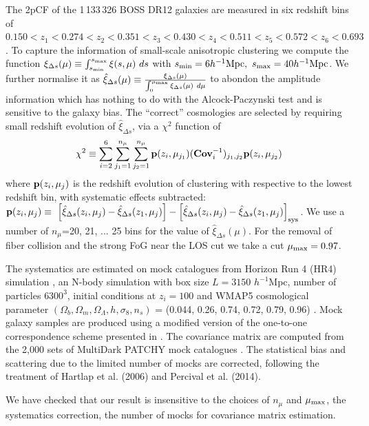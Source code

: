 \documentclass[useAMS,usenatbib]{mnras}
\begin{document}
The 2pCF of the 1\,133\,326 BOSS DR12 galaxies are measured in six redshift bins of
$0.150<z_1<0.274<z_2<0.351<z_3<0.430<z_4<0.511<z_5<0.572<z_6<0.693$.
To capture the information of small-scale anisotropic clustering we compute the function
$\xi_{\Delta s} (\mu) \equiv \int_{s_{\rm min}}^{s_{\rm max}} \xi (s,\mu)\ ds$
with $s_{\rm min}=6 h^{-1} {\rm Mpc},\ s_{\rm max}=40 h^{-1} {\rm Mpc}$.
We further normalise it as 
$\hat\xi_{\Delta s}(\mu) \equiv \frac{\xi_{\Delta s}(\mu)}{\int_{0}^{\mu_{\rm max}}\xi_{\Delta s}(\mu)\ d\mu}$
to abondon the amplitude information which has nothing to do with the Alcock-Paczynski test and is sensitive to the galaxy bias.
The ``correct'' cosmologies are selected by requiring small redshift evolution of $\hat\xi_{\Delta s}$,
via a $\chi^2$ function of 
\begin{equation}
 \chi^2\equiv \sum_{i=2}^{6} \sum_{j_1=1}^{n_{\mu}} \sum_{j_2=1}^{n_{\mu}} {\bf p}(z_i,\mu_{j_1}) ({\bf Cov}_{i}^{-1})_{j_1,j_2}  {\bf p}(z_i,\mu_{j_2})
\end{equation}
where ${\bf p}(z_i,\mu_{j})$ is the redshift evolution of clustering with respective to the lowest redshift bin,
with systematic effects subtracted:
$ {\bf p}(z_i,\mu_{j}) \equiv\  \left[\hat\xi_{\Delta s}(z_i,\mu_j)-\hat\xi_{\Delta s}(z_1,\mu_j)\right] - \left[\hat\xi_{\Delta s}(z_i,\mu_j)-\hat\xi_{\Delta s}(z_1,\mu_j)\right]_{\rm sys}$.
We use a number of $n_{\mu}$=20, 21, ... 25 bins for the value of $\hat\xi_{\Delta s}(\mu)$.
For the removal of fiber collision and the strong FoG near the LOS cut we take a cut $\mu_{\rm max} = 0.97$.

The systematics are estimated on mock catalogues from Horizon Run 4 (HR4) simulation \cite{HR4},
an N-body simulation with box size $L={3150}$ $h^{-1}$Mpc, number of particles $6300^3$,   
initial conditions at $z_{i}=100$ and WMAP5 cosmological parameter 
$(\Omega_{b},\Omega_{m},\Omega_\Lambda,h,\sigma_8,n_s)$  = (0.044, 0.26, 0.74, 0.72, 0.79, 0.96) \citep[]{komatsu 2011}.
Mock galaxy samples are produced using a modified version of the one-to-one correspondence scheme presented in \citep{hong2016}. 
The covariance matrix are computed from the 2,000 sets of MultiDark PATCHY mock catalogues \citep{MDPATCHY}.
The statistical bias and scattering due to the limited number of mocks are corrected,
following the treatment of Hartlap et al. (2006) and Percival et al. (2014).

We have checked that our result is insensitive to the choices of $n_\mu$ and $\mu_{\rm max}$,
the systematics correction, the number of mocks for covariance matrix estimation.
\end{document}
